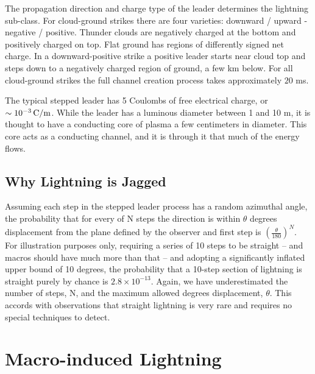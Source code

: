 \documentclass[%
 reprint,
 amsmath,amssymb,
 aps,
]{revtex4-2}
\newcommand{\vtwo}[1]{{\color{red} #1}}
\begin{document}
    The propagation direction and charge type of the leader determines the lightning sub-class. For cloud-ground strikes there are four varieties: downward / upward - negative / positive. Thunder clouds are negatively charged at the bottom and positively charged on top. Flat ground has regions of differently signed net charge. \vtwo{In a downward-positive strike a positive leader starts near cloud top and steps down to a negatively charged region of ground, a few km below.} For all cloud-ground strikes the full channel creation process takes approximately $20$ ms.

    The typical stepped leader has 5 Coulombs of free electrical charge, or $\sim10^{-3} \, \rm{C/m}$. While the leader has a luminous diameter between 1 and 10 m, it is thought to have a conducting core of plasma a few centimeters in diameter. This core acts as a conducting channel, and it is through it that much of the energy flows.
    
    
    \subsection*{Why Lightning is Jagged} %
    \label{sub:why_lightning_is_jagged}

        \vtwo{Assuming each step in the stepped leader process has a random azimuthal angle, the probability that for every of N steps the direction is within $\theta$ degrees displacement from the plane defined by the observer and first step is $\left(\frac{\theta}{180}\right)^{N}$. For illustration purposes only, requiring a series of 10 steps to be straight -- and macros should have much more than that -- and adopting a significantly inflated upper bound of 10 degrees, the probability that a 10-step section of lightning is straight purely by chance is $2.8 \times 10^{-13}$. Again, we have underestimated the number of steps, N, and the maximum allowed degrees displacement, $\theta$. This accords with observations that straight lightning is very rare and requires no special techniques to detect.}
        



\section{Macro-induced \textbf{}Lightning} %
\label{sec:macro_induced_lightning}
\end{document}

